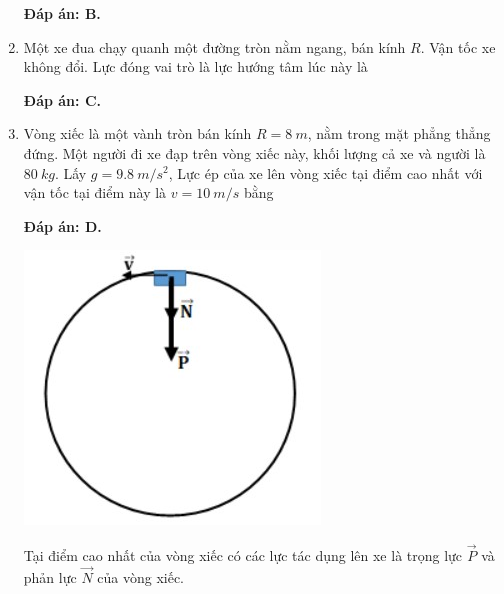 \begin{enumerate}[label=\bfseries Câu \arabic*:]
	\hideall
	{	
		\textbf{Đáp án: B.}
		
	}
	\item {}
	
	
	{Một xe đua chạy quanh một đường tròn nằm ngang, bán kính $R$. Vận tốc xe không đổi. Lực đóng vai trò là lực hướng tâm lúc này là
	}
	
	\hideall
	{	
		\textbf{Đáp án: C.}
	}
	\item {}
	
	
	{Vòng xiếc là một vành tròn bán kính $R = \SI{8}{m}$, nằm trong mặt phẳng thẳng đứng. Một người đi xe đạp trên vòng xiếc này, khối lượng cả xe và người là $\SI{80}{kg}$. Lấy $g = \SI{9,8}{m/s^2}$, Lực ép của xe lên vòng xiếc tại điểm cao nhất với vận tốc tại điểm này là $v = \SI{10}{m/s}$ bằng
	}
	
	\hideall
	{	
		\textbf{Đáp án: D.}
		
		\begin{center}
			\includegraphics[scale=0.6]{../figs/VN10-2022-PH-TP0005-1.jpg}
		\end{center}
		
		Tại điểm cao nhất của vòng xiếc có các lực tác dụng lên xe là trọng lực $\vec P$ và phản lực $\vec N$ của vòng xiếc.
		
}
\end{enumerate}
